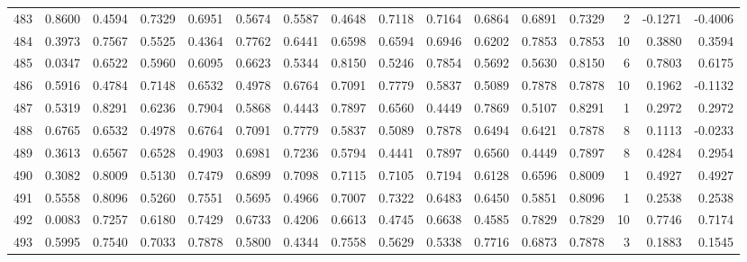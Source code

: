 \begin{tabular}{lrrrrrrrrrrrrrrr}
483 &      0.8600 &  0.4594 &  0.7329 &  0.6951 &  0.5674 &  0.5587 &  0.4648 &  0.7118 &  0.7164 &  0.6864 &   0.6891 &     0.7329 &      2 &                   -0.1271 &                    -0.4006 \\
484 &      0.3973 &  0.7567 &  0.5525 &  0.4364 &  0.7762 &  0.6441 &  0.6598 &  0.6594 &  0.6946 &  0.6202 &   0.7853 &     0.7853 &     10 &                    0.3880 &                     0.3594 \\
485 &      0.0347 &  0.6522 &  0.5960 &  0.6095 &  0.6623 &  0.5344 &  0.8150 &  0.5246 &  0.7854 &  0.5692 &   0.5630 &     0.8150 &      6 &                    0.7803 &                     0.6175 \\
486 &      0.5916 &  0.4784 &  0.7148 &  0.6532 &  0.4978 &  0.6764 &  0.7091 &  0.7779 &  0.5837 &  0.5089 &   0.7878 &     0.7878 &     10 &                    0.1962 &                    -0.1132 \\
487 &      0.5319 &  0.8291 &  0.6236 &  0.7904 &  0.5868 &  0.4443 &  0.7897 &  0.6560 &  0.4449 &  0.7869 &   0.5107 &     0.8291 &      1 &                    0.2972 &                     0.2972 \\
488 &      0.6765 &  0.6532 &  0.4978 &  0.6764 &  0.7091 &  0.7779 &  0.5837 &  0.5089 &  0.7878 &  0.6494 &   0.6421 &     0.7878 &      8 &                    0.1113 &                    -0.0233 \\
489 &      0.3613 &  0.6567 &  0.6528 &  0.4903 &  0.6981 &  0.7236 &  0.5794 &  0.4441 &  0.7897 &  0.6560 &   0.4449 &     0.7897 &      8 &                    0.4284 &                     0.2954 \\
490 &      0.3082 &  0.8009 &  0.5130 &  0.7479 &  0.6899 &  0.7098 &  0.7115 &  0.7105 &  0.7194 &  0.6128 &   0.6596 &     0.8009 &      1 &                    0.4927 &                     0.4927 \\
491 &      0.5558 &  0.8096 &  0.5260 &  0.7551 &  0.5695 &  0.4966 &  0.7007 &  0.7322 &  0.6483 &  0.6450 &   0.5851 &     0.8096 &      1 &                    0.2538 &                     0.2538 \\
492 &      0.0083 &  0.7257 &  0.6180 &  0.7429 &  0.6733 &  0.4206 &  0.6613 &  0.4745 &  0.6638 &  0.4585 &   0.7829 &     0.7829 &     10 &                    0.7746 &                     0.7174 \\
493 &      0.5995 &  0.7540 &  0.7033 &  0.7878 &  0.5800 &  0.4344 &  0.7558 &  0.5629 &  0.5338 &  0.7716 &   0.6873 &     0.7878 &      3 &                    0.1883 &                     0.1545 \\

\end{tabular}
